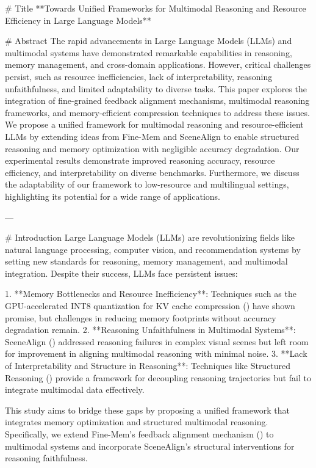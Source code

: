 # Title  
**Towards Unified Frameworks for Multimodal Reasoning and Resource Efficiency in Large Language Models**  

# Abstract  
The rapid advancements in Large Language Models (LLMs) and multimodal systems have demonstrated remarkable capabilities in reasoning, memory management, and cross-domain applications. However, critical challenges persist, such as resource inefficiencies, lack of interpretability, reasoning unfaithfulness, and limited adaptability to diverse tasks. This paper explores the integration of fine-grained feedback alignment mechanisms, multimodal reasoning frameworks, and memory-efficient compression techniques to address these issues. We propose a unified framework for multimodal reasoning and resource-efficient LLMs by extending ideas from Fine-Mem and SceneAlign to enable structured reasoning and memory optimization with negligible accuracy degradation. Our experimental results demonstrate improved reasoning accuracy, resource efficiency, and interpretability on diverse benchmarks. Furthermore, we discuss the adaptability of our framework to low-resource and multilingual settings, highlighting its potential for a wide range of applications.  

---

# Introduction  
Large Language Models (LLMs) are revolutionizing fields like natural language processing, computer vision, and recommendation systems by setting new standards for reasoning, memory management, and multimodal integration. Despite their success, LLMs face persistent issues:  

1. **Memory Bottlenecks and Resource Inefficiency**: Techniques such as the GPU-accelerated INT8 quantization for KV cache compression (\cite{taneja2026gpuacceleratedint8quantizationkv}) have shown promise, but challenges in reducing memory footprints without accuracy degradation remain.  
2. **Reasoning Unfaithfulness in Multimodal Systems**: SceneAlign (\cite{wang2026scenealignaligningmultimodalreasoning}) addressed reasoning failures in complex visual scenes but left room for improvement in aligning multimodal reasoning with minimal noise.  
3. **Lack of Interpretability and Structure in Reasoning**: Techniques like Structured Reasoning (\cite{han2026structuredreasoninglargelanguage}) provide a framework for decoupling reasoning trajectories but fail to integrate multimodal data effectively.  

This study aims to bridge these gaps by proposing a unified framework that integrates memory optimization and structured multimodal reasoning. Specifically, we extend Fine-Mem’s feedback alignment mechanism (\cite{ma2026finememfinegrainedfeedbackalignment}) to multimodal systems and incorporate SceneAlign’s structural interventions for reasoning faithfulness.  

